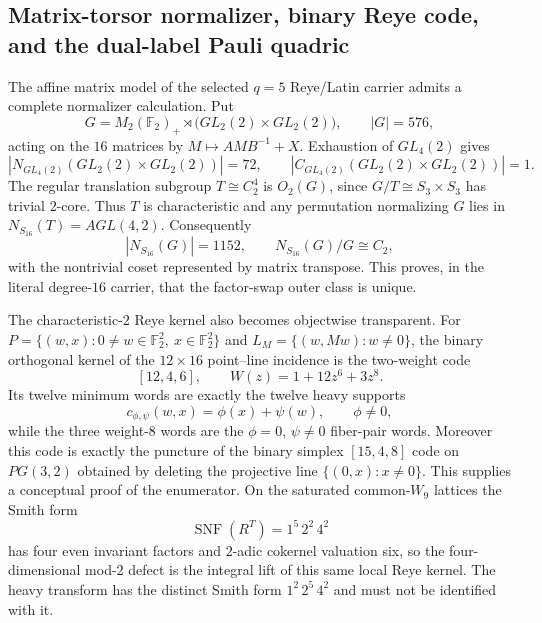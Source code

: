 \subsection*{Matrix-torsor normalizer, binary Reye code, and the dual-label Pauli quadric}

The affine matrix model of the selected $q=5$ Reye/Latin carrier admits a complete
normalizer calculation.  Put
\[
G=M_2(\mathbb F_2)_+\rtimes\bigl(GL_2(2)\times GL_2(2)\bigr),
\qquad |G|=576,
\]
acting on the $16$ matrices by $M\mapsto AMB^{-1}+X$.  Exhaustion of
$GL_4(2)$ gives
\[
\left|N_{GL_4(2)}(GL_2(2)\times GL_2(2))\right|=72,
\qquad
\left|C_{GL_4(2)}(GL_2(2)\times GL_2(2))\right|=1.
\]
The regular translation subgroup $T\cong C_2^4$ is $O_2(G)$, since
$G/T\cong S_3\times S_3$ has trivial $2$-core.  Thus $T$ is characteristic and
any permutation normalizing $G$ lies in $N_{S_{16}}(T)=AGL(4,2)$.  Consequently
\[
\boxed{|N_{S_{16}}(G)|=1152},
\qquad
\boxed{N_{S_{16}}(G)/G\cong C_2},
\]
with the nontrivial coset represented by matrix transpose.  This proves, in the
literal degree-$16$ carrier, that the factor-swap outer class is unique.

The characteristic-$2$ Reye kernel also becomes objectwise transparent.  For
$P=\{(w,x):0\ne w\in\mathbb F_2^2,\ x\in\mathbb F_2^2\}$ and
$L_M=\{(w,Mw):w\ne0\}$, the binary orthogonal kernel of the $12\times16$
point--line incidence is the two-weight code
\[
[12,4,6],\qquad W(z)=1+12z^6+3z^8.
\]
Its twelve minimum words are exactly the twelve heavy supports
\[
c_{\phi,\psi}(w,x)=\phi(x)+\psi(w),\qquad \phi\ne0,
\]
while the three weight-$8$ words are the $\phi=0$, $\psi\ne0$ fiber-pair
words.  Moreover this code is exactly the puncture of the binary simplex
$[15,4,8]$ code on $PG(3,2)$ obtained by deleting the projective line
$\{(0,x):x\ne0\}$.  This supplies a conceptual proof of the enumerator.  On the
saturated common-$W_9$ lattices the Smith form
\[
\operatorname{SNF}(R^T)=1^5\,2^2\,4^2
\]
has four even invariant factors and $2$-adic cokernel valuation six, so the
four-dimensional mod-$2$ defect is the integral lift of this same local Reye
kernel.  The heavy transform has the distinct Smith form
$1^2\,2^5\,4^2$ and must not be identified with it.

